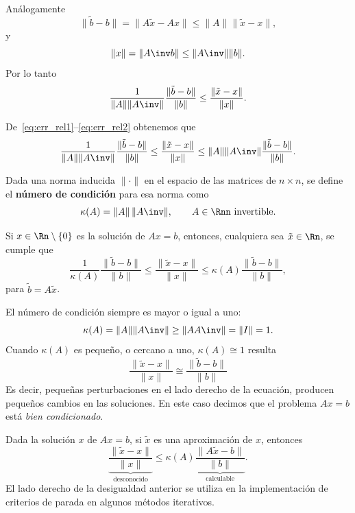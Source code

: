 Análogamente
\[
\| \tilde b - b \| = \| A \tilde x - A x \| \le \| A \| \| \tilde x - x \|,
\]
y
\[
\| x \| = \| A\inv b \| \le \| A\inv \| \| b \|.
\]
Por lo tanto
\begin{equation}\label{eq:err_rel2}
  \frac{1}{\| A \| \| A\inv\|} \frac{\| \tilde b - b \|}{\| b \|}
  \le \frac{\| \tilde x - x \| }{\| x \|}.
\end{equation}

De~\eqref{eq:err_rel1}--\eqref{eq:err_rel2} obtenemos que
\begin{equation}\label{eq:err_rel}
  \frac{1}{\| A \| \| A\inv\|} \frac{\| \tilde b - b \|}{\| b \|}
  \le \frac{\| \tilde x - x \| }{\| x \|}
  \le \| A \| \| A\inv\| \frac{\| \tilde b - b \|}{\| b \|}.
\end{equation}

\begin{defn}
  Dada una norma inducida $\| \cdot \|$ en el espacio de las matrices de $n\times n$, se define el \textbf{número de condición} para esa norma como
  \[
  \kappa (A ) =  \| A \| \, \| A\inv\|, \qquad A \in \Rnn \text{ invertible}.
  \]
\end{defn}

\begin{lema}\label{L:error-vs-residuo}
Si $x \in \Rn \setminus\{0\}$ es la solución de $Ax = b$, entonces, cualquiera sea $\tilde x \in \Rn$, se cumple que
\[
  \frac{1}{\kappa(A)} \frac{\| \tilde b - b \|}{\| b \|}
  \le \frac{\| \tilde x - x \| }{\| x \|}
  \le \kappa(A) \frac{\| \tilde b - b \|}{\| b \|},
  \]
  para $\tilde b = A \tilde x$.
\end{lema}



\begin{remark} El número de condición siempre es mayor o igual a uno:
  \[
  \kappa(A) =  \| A \| \| A\inv\| \ge \| A A\inv \| = \| I \| = 1.
  \]
  Cuando $\kappa(A)$ es pequeño, o cercano a uno, $\kappa(A) \cong 1$ resulta
  \[
  \frac{\| \tilde x - x \| }{\| x \|}
  \cong \frac{\| \tilde b - b \|}{\| b \|}
  \]
  Es decir, pequeñas perturbaciones en el lado derecho de la ecuación, producen pequeños cambios en las soluciones. En este caso decimos que el problema $Ax=b$ está \emph{bien condicionado}.
\end{remark}

\begin{remark}
  Dada la solución $x$ de $Ax = b$, si $\tilde x$ es una aproximación de $x$, entonces
  \[
  \underbrace{\frac{\| \tilde x - x \| }{\| x \|}}_{\text{desconocido}} \le \kappa(A)
  \underbrace{\frac{\| A \tilde x - b \|}{\| b \|}}_{\text{calculable}}.
  \]
  El lado derecho de la desigualdad anterior se utiliza en la implementación de criterios de parada en algunos métodos iterativos.
\end{remark}

